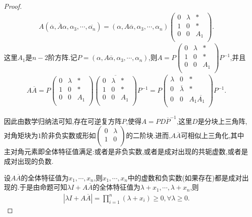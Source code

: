 \documentclass[../../main.tex]{subfiles}%
\begin{document}
\begin{proof}
\begin{align*}
A\left( \overline{\alpha },\overline{A}\alpha ,\alpha _3,\cdots ,\overline{\alpha _n} \right) =\left( \alpha ,A\overline{\alpha },\alpha _3,\cdots ,\alpha _n \right) \begin{pmatrix}
0&		\lambda&		*\\
1&		0&		*\\
0&		0&		A_1\\
\end{pmatrix}.
\end{align*}
这里$A_1$是$n-2$阶方阵.记$P=\left( \alpha ,A\overline{\alpha },\alpha _3,\cdots ,\alpha _n \right)$,则$A=P\begin{pmatrix}
0&		\lambda&		*\\
1&		0&		*\\
0&		0&		A_1\\
\end{pmatrix} P^{-1}$,并且
\begin{align*}
A\overline{A}=P\begin{pmatrix}
0&		\lambda&		*\\
1&		0&		*\\
0&		0&		A_1\\
\end{pmatrix} \overline{\begin{pmatrix}
0&		\lambda&		*\\
1&		0&		*\\
0&		0&		A_1\\
\end{pmatrix} }P^{-1}=P\begin{pmatrix}
\lambda&		0&		*\\
0&		\overline{\lambda }&		*\\
0&		0&		A_1\overline{A_1}\\
\end{pmatrix} P^{-1}.
\end{align*}

因此由数学归纳法可知,存在可逆复方阵$P$,使得$A=PD\overline{P}^{-1}$,这里$D$是分块上三角阵,对角矩块为$1$阶非负实数或形如$\begin{pmatrix}
0&		\lambda\\
1&		0\\
\end{pmatrix}$的二阶块.进而,$A\overline{A}$可相似上三角化,其中主对角元素即全体特征值满足:或者是非负实数,或者是成对出现的共轭虚数,或者是成对出现的负数.

设$A\overline{A}$的全体特征值为$x_1,\cdots ,x_n$,则$x_1,\cdots ,x_n$中的虚数和负实数(如果存在)都是成对出现的.于是由命题可知$\lambda I+A\overline{A}$的全体特征值为$\lambda +x_1,\cdots ,\lambda +x_n$,则
\begin{align*}
\left| \lambda I+A\overline{A} \right|=\prod_{i=1}^n{\left( \lambda +x_i \right)}\geqslant 0,\forall \lambda \geqslant 0.
\end{align*}

\end{proof}
\end{document}
